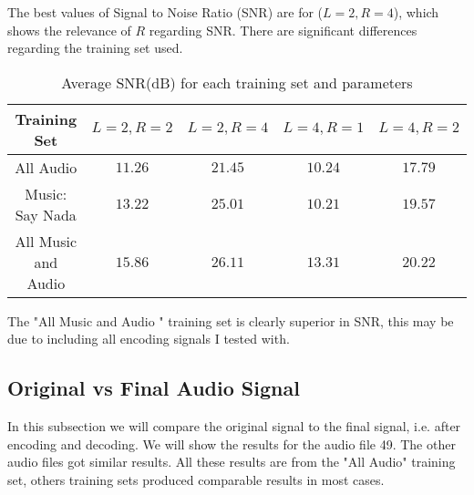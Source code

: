\documentclass[a4paper, 11pt]{article}
\begin{document}
		The best values of Signal to Noise Ratio (SNR) are for ($ L=2, R=4 $), which shows the relevance of $R$ regarding SNR.
		There are significant differences regarding the training set used.
		
		\begin{table}[H]
			\centering
			\begin{tabular}{c|c|c|c|c}
				\textbf{Training Set} 		& \textbf{$ L=2, R=2 $} 	& \textbf{$ L=2, R=4 $}	&  \textbf{$ L=4, R=1 $}	& \textbf{$ L=4, R=2 $} \\ \hline
				All Audio 					& $ 11.26 $ 	& $ 21.45 $		& $ 10.24 $ 	& $ 17.79 $	\\ \hline
				Music: Say Nada				& $ 13.22 $		& $ 25.01 $		& $ 10.21 $ 	& $ 19.57 $	\\ \hline
				All Music and Audio 	& $ 15.86 $		& $	26.11 $		& $ 13.31 $		& $	20.22 $	\\
			\end{tabular}
			\caption{Average SNR(dB) for each training set and parameters}
			\label{table:EncodeSNRT}
		\end{table}
		
		The "All Music and Audio " training set is clearly superior in SNR, this may be due to including all encoding signals I tested with.
		
		\subsection{Original vs Final Audio Signal}
			In this subsection we will compare the original signal to the final signal, i.e. after encoding and decoding.
			We will show the results for the audio file 49.
			The other audio files got similar results. 
			All these results are from the "All Audio" training set, others training sets produced comparable results in most cases.
			
\end{document}
